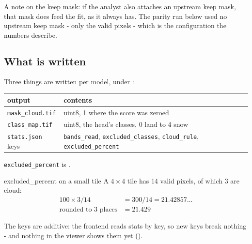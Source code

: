 A note on the keep mask: if the analyst also attaches an upstream  keep mask, that mask does feed
the fit, as it always has. The parity run below used no upstream keep mask - only the valid pixels - which is the
configuration the numbers describe.

\subsection{What is written}

Three things are written per model, under :
\begin{center}
\small
\begin{tabular}{ll}
\toprule
output & contents \\
\midrule
\texttt{mask\_cloud.tif} & uint8, 1 where the score was zeroed \\
\texttt{class\_map.tif} & uint8, the head's classes, 0 land to 4 snow \\
\texttt{stats.json} keys & \texttt{bands\_read}, \texttt{excluded\_classes}, \texttt{cloud\_rule}, \texttt{excluded\_percent} \\
\bottomrule
\end{tabular}
\end{center}
\texttt{excluded\_percent} is .

\begin{worked}[label={we:shipping:percent}]{excluded\_percent on a small tile}
A $4 \times 4$ tile has 14 valid pixels, of which 3 are cloud:
\begin{align*}
100 \times 3 / 14 &= 300 / 14 = 21.42857\ldots\\
\text{rounded to 3 places} &= 21.429
\end{align*}
\end{worked}

The keys are additive: the frontend reads stats by key, so new keys break nothing - and nothing in the viewer shows them
yet ().

